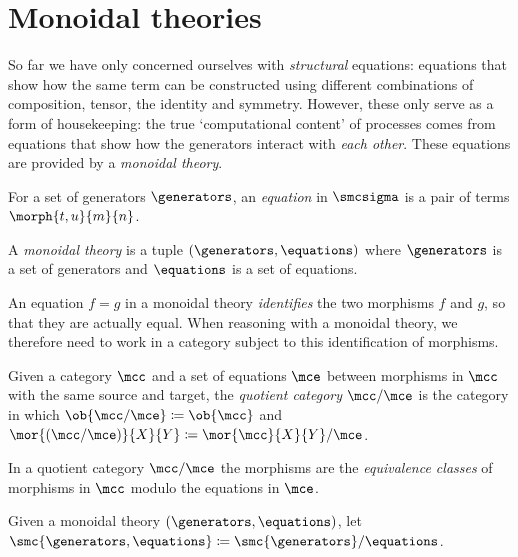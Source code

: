 \section{Monoidal theories}\label{sec:monoidal-theories}

So far we have only concerned ourselves with \emph{structural} equations:
equations that show how the same term can be constructed using different
combinations of composition, tensor, the identity and symmetry.
However, these only serve as a form of housekeeping: the true `computational
content' of processes comes from equations that show how the generators interact
with \emph{each other}.
These equations are provided by a \emph{monoidal theory}.

\begin{definition}
    For a set of generators \(\generators\), an \emph{equation} in \(\smcsigma\)
    is a pair of terms \(\morph{t,u}{m}{n}\).
\end{definition}

\begin{definition}
    A \emph{monoidal theory} is a tuple \((\generators, \equations)\) where
    \(\generators\) is a set of generators and \(\equations\) is a set of
    equations.
\end{definition}

An equation \(f = g\) in a monoidal theory \emph{identifies} the two morphisms
\(f\) and \(g\), so that they are actually equal.
When reasoning with a monoidal theory, we therefore need to work in a category
subject to this identification of morphisms.

\begin{definition}
    Given a category \(\mcc\) and a set of equations \(\mce\) between
    morphisms in \(\mcc\) with the same source and target, the
    \emph{quotient category} \(\mcc / \mce\) is the category in which
    \(\ob{\mcc / \mce} \coloneqq \ob{\mcc}\) and \(
    \mor{(\mcc / \mce)}{X}{Y}
    \coloneqq
    \mor{\mcc}{X}{Y} / \mce
    \).
\end{definition}

In a quotient category \(\mcc / \mce\) the morphisms are the
\emph{equivalence classes} of morphisms in \(\mcc\) modulo the equations in
\(\mce\).

\begin{definition}
    Given a monoidal theory \((\generators, \equations)\), let
    \(\smc{\generators, \equations} \coloneqq \smc{\generators} / \equations\).
\end{definition}

